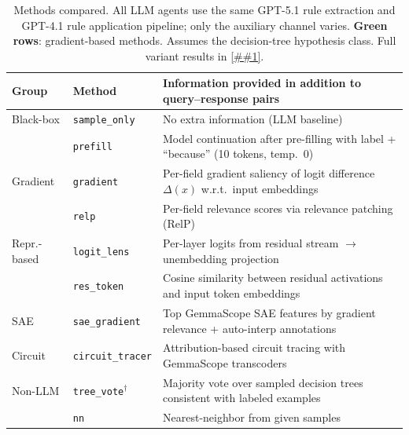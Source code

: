 \documentclass{article} %
\newcommand{\Cref}[1]{\ref{##1}}
\begin{document}
\begin{table}[t]
\begin{center}
\small
\renewcommand{\arraystretch}{1.0}
\begin{tabular}{@{}l l p{8.2cm}@{}}
\toprule
\textbf{Group} & \textbf{Method} & \textbf{Information provided in addition to query--response pairs} \\
\midrule
Black-box
& \texttt{sample\_only} & No extra information (LLM baseline) \\
& \texttt{prefill} & Model continuation after pre-filling with label + ``because'' (10 tokens, temp.\ 0) \\[3pt]
\rowcolor{gradrow}
Gradient & \texttt{gradient} & Per-field gradient saliency of logit difference $\Delta(x)$ w.r.t.\ input embeddings \\
\rowcolor{gradrow}
& \texttt{relp} & Per-field relevance scores via relevance patching (RelP)~\citep{relp2025} \\[3pt]
Repr.-based & \texttt{logit\_lens} & Per-layer logits from residual stream $\to$ unembedding projection~\citep{nostalgebraist2020logitlens} \\
& \texttt{res\_token} & Cosine similarity between residual activations and input token embeddings \\[3pt]
SAE & \texttt{sae\_gradient} & Top GemmaScope SAE features by gradient relevance + auto-interp annotations \\[3pt]
Circuit & \texttt{circuit\_tracer} & Attribution-based circuit tracing with GemmaScope transcoders~\citep{gemmascope2024} \\[3pt]
Non-LLM & \texttt{tree\_vote}$^\dagger$ & Majority vote over sampled decision trees consistent with labeled examples \\
& \texttt{nn} & Nearest-neighbor from given samples \\
\bottomrule
\end{tabular}
\renewcommand{\arraystretch}{1.0}
\end{center}
\vspace{-0.1in}
\caption{Methods compared. All LLM agents use the same GPT-5.1 rule extraction and GPT-4.1 rule application pipeline; only the auxiliary channel varies. {\setlength{\fboxsep}{1pt}\colorbox{gradrow}{\textbf{Green rows}}}: gradient-based methods.\smash{$^\dagger$} Assumes the decision-tree hypothesis class. Full variant results in \Cref{app:variants}.}
\vspace{-0.18in}
\label{tab:methods}
\end{table}
\end{document}

